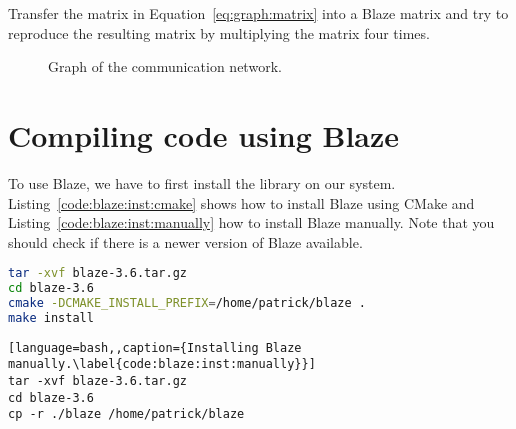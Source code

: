 \documentclass[11pt,fleqn]{book} %
\begin{document}
\begin{exercise}
Transfer the matrix in Equation~\ref{eq:graph:matrix} into a Blaze matrix and try to reproduce the resulting matrix by multiplying the matrix four times.
\end{exercise}

\begin{figure}[tb]
\centering
{}
\caption{Graph of the communication network.}
\label{fig:matrix:application:graph}
\end{figure}

\section{Compiling code using Blaze}
To use Blaze, we have to first install the library on our system. Listing~\ref{code:blaze:inst:cmake} shows how to install Blaze using CMake and Listing~\ref{code:blaze:inst:manually} how to install Blaze manually. Note that you should check if there is a newer version of Blaze available.

\begin{minipage}{\linewidth}
\begin{minipage}{0.45\linewidth}
\begin{lstlisting}[language=bash,caption={Installing Blaze using CMake.\label{code:blaze:inst:cmake}}]
tar -xvf blaze-3.6.tar.gz
cd blaze-3.6
cmake -DCMAKE_INSTALL_PREFIX=/home/patrick/blaze .
make install
\end{lstlisting}
\end{minipage}
\hfill
\begin{minipage}{0.45\linewidth}
\begin{lstlisting}[language=bash,,caption={Installing Blaze manually.\label{code:blaze:inst:manually}}]
tar -xvf blaze-3.6.tar.gz
cd blaze-3.6
cp -r ./blaze /home/patrick/blaze
\end{lstlisting}
\end{minipage}
\end{minipage}
\end{document}

